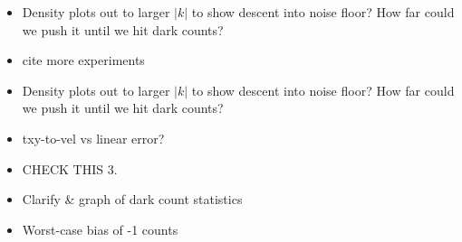 \begin{itemize}
\item {Density plots out to larger $|k|$ to show descent into noise floor? How far could we push it until we hit dark counts?}
\item {cite more experiments}
\item {Density plots out to larger $|k|$ to show descent into noise floor? How far could we push it until we hit dark counts?}
\item {txy-to-vel vs linear error?}
\item {CHECK THIS 3.}
\item {Clarify \& graph of dark count statistics}
\item {Worst-case bias of -1 counts}
\end{itemize}
